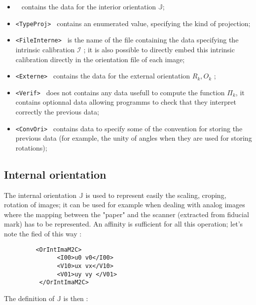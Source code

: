 \begin{itemize}
    \item {\tt <OrIntImaM2C> } contains the data for the interior orientation $\mathbb{J}$;
    \item {\tt <TypeProj> } contains an enumerated value, specifying the kind of projection;
    \item {\tt <FileInterne> } is the name of the file containing the data specifying the
          intrinsic calibration  $  \mathcal{I}$ ; it is also possible to directly embed
          this intrinsic calibration directly in the orientation file of each image;
    \item {\tt <Externe> } contains the data for the external orientation $R_k,O_k$ ;
 
     \item {\tt  <Verif> } does not contains any data usefull to compute the function $\Pi_k$,
           it contains optionnal data allowing programms to check that they interpret 
           correctly the  previous data;
        
     \item {\tt  <ConvOri> } contains data to specify some of the convention  for storing
           the previous data (for example, the unity of angles when they are used for 
           storing rotations);
      
\end{itemize}


\subsection{Internal orientation}
\label{Image:Int:Ori}

The internal orientation  $\mathbb{J}$ is used to represent easily the scaling,
croping, rotation of images; it can be used for example when dealing with
analog images where the mapping between the "paper" and the scanner (extracted
from fiducial mark) has to be represented. An affinity is sufficient for
all this operation;  let's note  the fied of {\tt <OrIntImaM2C>} this way :

\begin{verbatim}
         <OrIntImaM2C>
               <I00>u0 v0</I00>
               <V10>ux vx</V10>
               <V01>uy vy </V01>
          </OrIntImaM2C>
\end{verbatim}

The definition of  $\mathbb{J}$ is then :

